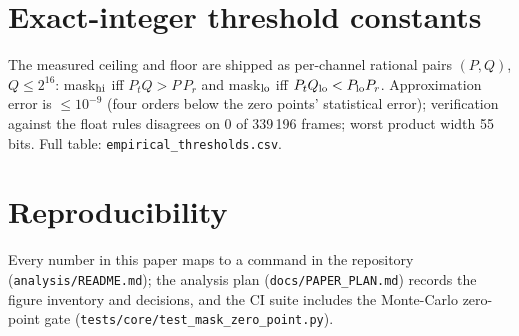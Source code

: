 \section{Exact-integer threshold constants}
\label{app:constants}
The measured ceiling and floor are shipped as per-channel rational pairs
$(P, Q)$, $Q \le 2^{16}$: mask$_{\rm hi}$ iff $P_t Q > P\,P_r$ and
mask$_{\rm lo}$ iff $P_t Q_{\rm lo} < P_{\rm lo} P_r$. Approximation error
is $\le 10^{-9}$ (four orders below the zero points' statistical error);
verification against the float rules disagrees on 0 of 339\,196 frames;
worst product width 55 bits. Full table:
\texttt{empirical\_thresholds.csv}.

\section{Reproducibility}
\label{app:repro}
Every number in this paper maps to a command in the repository
(\texttt{analysis/README.md}); the analysis plan
(\texttt{docs/PAPER\_PLAN.md}) records the figure inventory and
decisions, and the CI suite includes the Monte-Carlo zero-point gate
(\texttt{tests/core/test\_mask\_zero\_point.py}).
